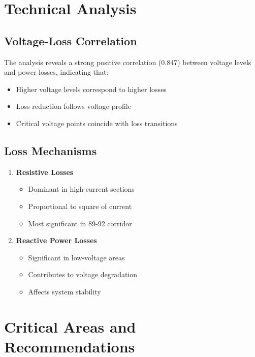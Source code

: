 \documentclass[11pt]{article}
\begin{document}
\section{Technical Analysis}

\subsection{Voltage-Loss Correlation}
The analysis reveals a strong positive correlation (0.847) between voltage levels and power losses, indicating that:
\begin{itemize}
    \item Higher voltage levels correspond to higher losses
    \item Loss reduction follows voltage profile
    \item Critical voltage points coincide with loss transitions
\end{itemize}

\subsection{Loss Mechanisms}
\begin{enumerate}
    \item \textbf{Resistive Losses}
    \begin{itemize}
        \item Dominant in high-current sections
        \item Proportional to square of current
        \item Most significant in 89-92 corridor
    \end{itemize}
    
    \item \textbf{Reactive Power Losses}
    \begin{itemize}
        \item Significant in low-voltage areas
        \item Contributes to voltage degradation
        \item Affects system stability
    \end{itemize}
\end{enumerate}

\section{Critical Areas and Recommendations}
\end{document}
